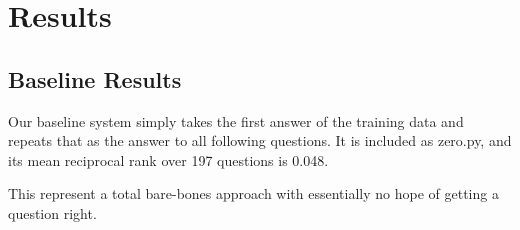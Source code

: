 \documentclass{article}
\begin{document}
\section{Results}


\subsection{Baseline Results}
Our baseline system simply takes the first answer of the training data and
repeats that as the answer to all following questions. It is included as
zero.py, and its mean reciprocal rank over 197 questions is 0.048.  

This represent a total bare-bones approach with essentially no hope of getting a
question right.
\end{document}
